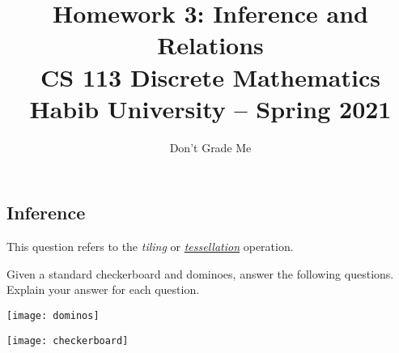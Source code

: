 \documentclass[addpoints]{exam}
\title{Homework 3: Inference and Relations\\ CS 113 Discrete Mathematics\\ Habib University -- Spring 2021}
\author{Don't Grade Me}  %
\date{}
\begin{document}
\maketitle

\begin{questions}

  \section{Inference}

\question This question refers to the \textit{tiling} or \href{https://en.wikipedia.org/wiki/Tessellation}{\textit{tessellation}} operation.
  
  \begin{minipage}{0.5 \linewidth}
    Given a standard checkerboard and dominoes, answer the following questions. Explain your answer for each question.\\
    \begin{center}
      \texttt{[image: dominos]}
    \end{center}
  \end{minipage} 
  \begin{minipage}{0.5 \linewidth}\begin{center}
      \texttt{[image: checkerboard]} \end{center}
  \end{minipage}


\end{questions}
\end{document}
